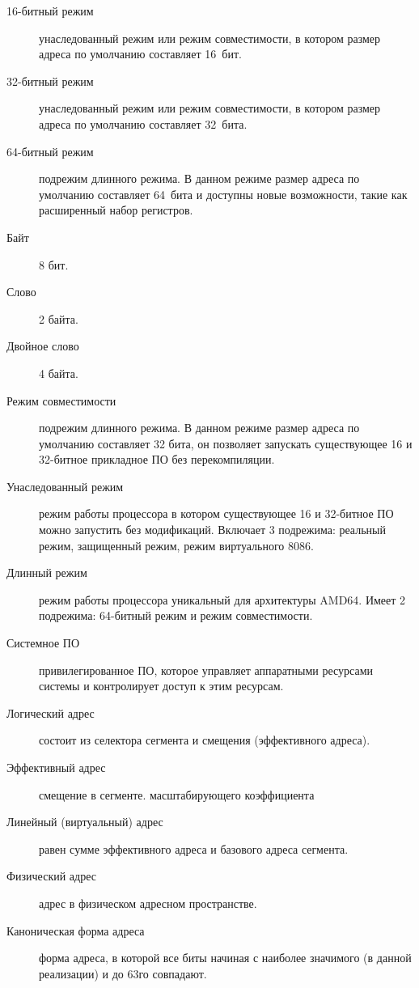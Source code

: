 \Defines
\begin{description}
\item[16-битный режим] унаследованный режим или режим совместимости, в котором размер адреса по умолчанию составляет 16~бит.
\item[32-битный режим] унаследованный режим или режим совместимости, в котором размер адреса по умолчанию составляет 32~бита.
\item[64-битный режим] подрежим длинного режима. В данном режиме размер адреса по умолчанию составляет 64~бита и доступны
новые возможности, такие как расширенный набор регистров.
\item[Байт] 8 бит.
\item[Слово] 2 байта.
\item[Двойное слово] 4 байта.
\item[Режим совместимости] подрежим длинного режима. В данном режиме размер адреса по умолчанию составляет 32 бита, он
позволяет запускать существующее 16 и 32-битное прикладное ПО без перекомпиляции.
\item[Унаследованный режим] режим работы процессора в котором существующее 16 и 32-битное ПО можно запустить без модификаций.
Включает 3 подрежима: реальный режим, защищенный режим, режим виртуального 8086.
\item[Длинный режим] режим работы процессора уникальный для архитектуры AMD64. Имеет 2 подрежима: 64-битный режим и
режим совместимости.
\item[Системное ПО] привилегированное ПО, которое управляет аппаратными ресурсами системы и контролирует доступ к этим ресурсам.
\item[Логический адрес] состоит из селектора сегмента и смещения (эффективного адреса).
\item[Эффективный адрес] смещение в сегменте.
масштабирующего коэффициента
\item[Линейный (виртуальный) адрес] равен сумме эффективного адреса и базового адреса сегмента.
\item[Физический адрес] адрес в физическом адресном пространстве.
\item[Каноническая форма адреса] форма адреса, в которой все биты начиная с наиболее значимого (в данной реализации) и до 63го совпадают.
\end{description}
